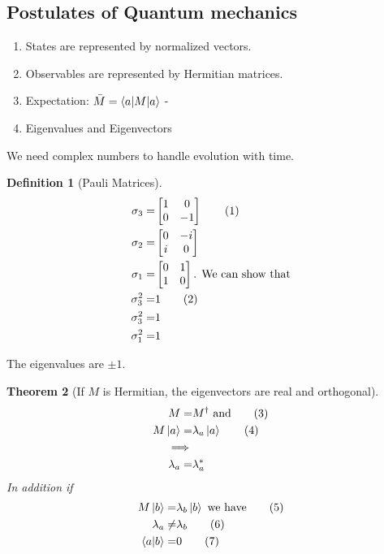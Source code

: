 \documentclass[]{article}
\newcommand\numberthis{\addtocounter{equation}{1}\tag{\theequation}}
\newtheorem{thm}{Theorem}
\newtheorem{defn}[thm]{Definition}
\begin{document}
\subsection{Postulates of Quantum mechanics}

\begin{enumerate}
	\item States are represented by normalized vectors.
	\item Observables are represented by Hermitian matrices.
	\item Expectation: $\bar{M}=\braket{a|M|a}$ - 
	\item Eigenvalues and Eigenvectors
\end{enumerate}


We need complex numbers to handle evolution with time.

\begin{defn}[Pauli Matrices]
	\begin{align*}
		\sigma_3 =& \begin{bmatrix} 1&0\\
			0&-1
		\end{bmatrix} \numberthis \label{eq:sigmas} \\
		\sigma_2 =& \begin{bmatrix}
			0 & -i\\
			i & 0
		\end{bmatrix}\\
		\sigma_1 =& \begin{bmatrix} 0&1\\
			1&0
		\end{bmatrix} \text{. We can show that}\\
		\sigma_3^2 =& 1 \numberthis \label{eq:sigma_sq}\\
		\sigma_3^2 =& 1\\
		\sigma_1^2 =& 1
	\end{align*}
\end{defn}

The eigenvalues are $\pm1$.


\begin{thm}[If $M$ is Hermitian,  the eigenvectors are real and orthogonal]
	\begin{align*}
		M =& M^\dagger \text{ and} \numberthis \label{eq:hermitian}\\
		M \ket{a} =& \lambda_a \ket{a} \numberthis \label{eq:sigma_ev1}\\
		\implies&\\
		\lambda_a =&\lambda_a^*
	\end{align*}
	In addition if
	\begin{align*}
		M \ket{b} =& \lambda_b \ket{b}\text{ we have} \numberthis \label{eq:sigma_ev2}\\
		\lambda_a \ne& \lambda_b \numberthis \label{eq:ne} \\
		\braket{a \vert b} =& 0 \numberthis \label{eq:orthogonal}
	\end{align*}
\end{thm}
\end{document}
